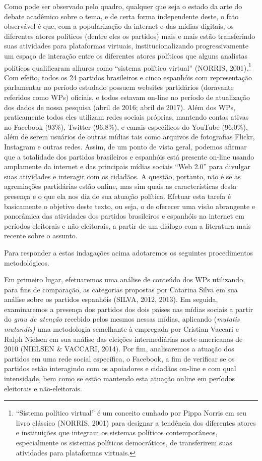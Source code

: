 Como pode ser observado pelo quadro, qualquer que seja o estado da arte
do debate acadêmico sobre o tema, e de certa forma independente deste, o
fato observável é que, com a popularização da internet e das mídias
digitais, os diferentes atores políticos (dentre eles os partidos) mais
e mais estão transferindo suas atividades para plataformas virtuais,
institucionalizando progressivamente um espaço de interação entre os
diferentes atores políticos que alguns analistas políticos qualificaram
alhures como ``sistema político virtual'' (NORRIS, 2001).\footnote{``Sistema
  político virtual'' é um conceito cunhado por Pippa Norris em seu livro
  clássico (NORRIS, 2001) para designar a tendência dos diferentes
  atores e instituições que integram os sistemas políticos
  contemporâneos, especialmente os sistemas políticos democráticos, de
  transferirem suas atividades para plataformas virtuais.} Com efeito,
todos os 24 partidos brasileiros e cinco espanhóis com representação
parlamentar no período estudado possuem websites partidários (doravante
referidos como WPs) oficiais, e todos estavam on-line no período de
atualização dos dados de nossa pesquisa (abril de 2016; abril de 2017).
Além dos WPs, praticamente todos eles utilizam redes sociais próprias,
mantendo contas ativas no Facebook (93\%), Twitter (96,8\%), e canais
específicos do YouTube (96,0\%), além de serem usuários de outras mídias
tais como arquivos de fotografias Flickr, Instagram e outras redes.
Assim, de um ponto de vista geral, podemos afirmar que a totalidade dos
partidos brasileiros e espanhóis está presente on-line usando amplamente
da internet e das principais mídias sociais ``Web 2.0'' para divulgar
suas atividades e interagir com os cidadãos. A questão, portanto, não é
se as agremiações partidárias estão online, mas sim quais as
características desta presença e o que ela nos diz de sua atuação
política. Efetuar esta tarefa é basicamente o objetivo deste texto, ou
seja, o de oferecer uma visão abrangente e panorâmica das atividades dos
partidos brasileiros e espanhóis na internet em períodos eleitorais e
não-eleitorais, a partir de um diálogo com a literatura mais recente
sobre o assunto.

Para responder a estas indagações acima adotaremos os seguintes
procedimentos metodológicos.

Em primeiro lugar, efetuaremos uma análise de conteúdo dos WPs
utilizando, para fins de comparação, as categorias propostas por
Catarina Silva em sua análise sobre os partidos espanhóis (SILVA, 2012,
2013). Em seguida, examinaremos a presença dos partidos dos dois países
nas mídias sociais a partir do \emph{grau de atenção} recebido pelos
mesmos nessas mídias, aplicando (\emph{mutatis mutandis)} uma
metodologia semelhante à empregada por Cristian Vaccari e Ralph Nielsen
em sua análise das eleições intermediárias norte-americanas de 2010
(NIELSEN \& VACCARI, 2014). Por fim, analisaremos a atuação dos partidos
em uma rede social específica, o Facebook, a fim de verificar se os
partidos estão interagindo com os apoiadores e cidadãos on-line e com
qual intensidade, bem como se estão mantendo esta atuação online em
períodos eleitorais e não-eleitorais.

